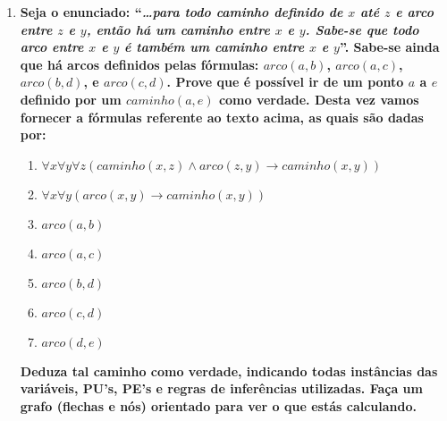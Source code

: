 \documentclass[a4paper,12pt]{article}
\begin{document}
\begin{enumerate}
\item {\bf Seja o enunciado: ``{\em \ldots para todo caminho definido de $x$ até $z$ e arco entre $z$ e $y$, então há um caminho entre $x$ e $y$. Sabe-se que todo arco 
entre $x$ e $y$ é também um caminho entre $x$ e $y$}''. Sabe-se ainda que há arcos
definidos pelas fórmulas: $arco(a,b)$, $arco(a,c)$, $arco(b,d)$,  e  $arco(c,d)$. 
Prove que é possível ir de um ponto $a$ a $e$ definido por  um 
$caminho(a,e)$ como verdade. Desta vez vamos fornecer
a fórmulas referente ao texto acima, as quais são dadas por:}


\begin{enumerate}
\setlength{\itemsep}{-2pt} 
  \item  $\forall x \forall y \forall z ( caminho(x,z) \wedge arco(z,y) \rightarrow  caminho(x,y) )$
\item $\forall x \forall y ( arco(x,y)  \rightarrow  caminho(x,y) )$
\item   $arco(a,b)$
\item   $arco(a,c)$
\item   $arco(b,d)$
\item   $arco(c,d)$
\item   $arco(d,e)$
\end{enumerate}
{\bf Deduza tal caminho como verdade, indicando todas instâncias
das variáveis,  PU's, PE's e regras de inferências
utilizadas. Faça um grafo (flechas e nós) orientado para ver o que estás calculando.}

\end{enumerate}
\end{document}
